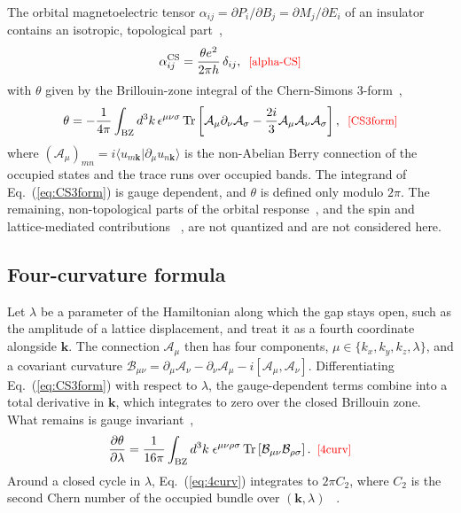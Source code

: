 \documentclass[galley,aps,pra,10pt,amsmath,amssymb,
    superscriptaddress,nofootinbib,longbibliography]{revtex4-2}
\def\Red#1{\textcolor{red}{#1}}
\newcounter{comm}
\def\commnext{\stepcounter{comm}}
\def\commtext{{\bf\color{blue}[\arabic{comm}]}}
\def\commmar{{\bf\color{blue}[\arabic{comm}]}}
\def\aum#1{\commnext\marginpar{\small AU\commmar: #1}\commtext}
\newcommand{\seclab}[1]{\label{sec:#1}{\Red{\small\;\;[sec:~#1]}}}
\newcommand{\eqlab}[1]{\Red{\hbox{\small\;\;[#1]}}\label{eq:#1}}
\def\aum#1{}
\newcommand{\eqlab}[1]{\label{eq:#1}}
\newcommand{\seclab}[1]{\label{sec:#1}}
\newcommand{\eq}[1]{Eq.~(\ref{eq:#1})}
\newcommand{\Tr}{\mathrm{Tr}\,}
\newcommand{\BB}{\mathcal{B}}              %
\begin{document}
The orbital magnetoelectric tensor $\alpha_{ij}=\partial P_i/\partial B_j=\partial M_j/\partial E_i$ of an insulator contains an isotropic, topological part~\cite{qi2008topological, essin2009magnetoelectric, essin2010orbital, malashevich2010theory},
\begin{equation}
\alpha^{\rm CS}_{ij}=\frac{\theta e^2}{2\pi h}\,\delta_{ij},
\eqlab{alpha-CS}
\end{equation}
with $\theta$ given by the Brillouin-zone integral of the Chern-Simons 3-form~\cite{chern1974characteristic},
\begin{equation}
\theta=-\frac{1}{4\pi}\int_{\rm BZ}d^3k\,\epsilon^{\mu\nu\sigma}\,\Tr\!\left[\mathcal A_\mu\partial_\nu\mathcal A_\sigma-\frac{2i}{3}\mathcal A_\mu\mathcal A_\nu\mathcal A_\sigma\right],
\eqlab{CS3form}
\end{equation}
where $(\mathcal A_\mu)_{mn}=i\langle u_{m\mathbf k}|\partial_\mu u_{n\mathbf k}\rangle$ is the non-Abelian Berry connection of the occupied states and the trace runs over occupied bands. The integrand of \eq{CS3form} is gauge dependent, and $\theta$ is defined only modulo $2\pi$.
The remaining, non-topological parts of the orbital response~\cite{essin2010orbital, malashevich2010theory}, and the spin and lattice-mediated contributions~\cite{iniguez2008firstprinciples, bousquet2011unexpectedly, malashevich2012full, ye2014dynamical} \aum{I think the spin and lattice-mediated contributions are not two separate things. In fact, the spin contribution is split into lattice-mediated and electronic contributions.}, are not quantized and are not considered here.


\subsection{Four-curvature formula}
\seclab{fourcurv}

Let $\lambda$ be a parameter of the Hamiltonian along which the gap stays open, such as the amplitude of a lattice displacement, and treat it as a fourth coordinate alongside $\mathbf k$. The connection $\mathcal A_\mu$ then has four
components, $\mu\in\{k_x,k_y,k_z,\lambda\}$, and a covariant curvature $\BB_{\mu\nu}=\partial_\mu\mathcal A_\nu-\partial_\nu\mathcal A_\mu-i[\mathcal A_\mu,\mathcal A_\nu]$.
Differentiating \eq{CS3form} with respect to $\lambda$, the gauge-dependent terms combine into a total derivative in $\mathbf k$, which integrates to zero over the
closed Brillouin zone. What remains is gauge invariant~\cite{qi2008topological, mong2010antiferromagnetic},
\begin{equation}
\frac{\partial\theta}{\partial\lambda}
=\frac{1}{16\pi}\int_{\rm BZ}d^3k\;\epsilon^{\mu\nu\rho\sigma}\,\Tr\!\left[\BB_{\mu\nu}\BB_{\rho\sigma}\right].
\eqlab{4curv}
\end{equation}
Around a closed cycle in $\lambda$, \eq{4curv} integrates to $2\pi C_2$, where
$C_2$ is the second Chern number of the occupied bundle over $(\mathbf k,\lambda)$ ~\cite{essin2009magnetoelectric, taherinejad2015adiabatic}.
\end{document}
